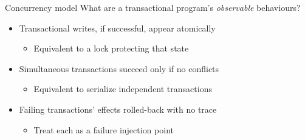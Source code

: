 \documentclass[xcolor=dvipsnames]{beamer}
\begin{document}
\begin{frame}{Concurrency model}
	What are a transactional program's {\em observable} behaviours?
	\begin{itemize}
		\item Transactional writes, if successful, appear atomically %
		\begin{itemize}
			\item Equivalent to a lock protecting that state
		\end{itemize}
			\pause
		\item Simultaneous transactions succeed only if no conflicts
		\begin{itemize}
			\item Equivalent
				to serialize independent transactions
		\end{itemize}
			\pause
		\item Failing transactions' effects rolled-back with no trace
		\begin{itemize}
			\item Treat each \xbegin as a failure injection point
		\end{itemize}
	\end{itemize}
\end{frame}
\end{document}
